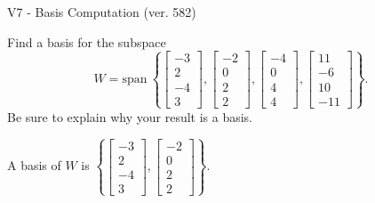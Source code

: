 \begin{exercise}
  \begin{exerciseTitle}V7 - Basis Computation (ver. 582)\end{exerciseTitle}
  \begin{exerciseStatement}
    Find a basis for the subspace 
\[W=\mathrm{span}\ \left\{\left[\begin{array}{r}
-3 \\
2 \\
-4 \\
3
\end{array}\right] , \left[\begin{array}{r}
-2 \\
0 \\
2 \\
2
\end{array}\right] , \left[\begin{array}{r}
-4 \\
0 \\
4 \\
4
\end{array}\right] , \left[\begin{array}{r}
11 \\
-6 \\
10 \\
-11
\end{array}\right]\right\}.\]
 Be sure to explain why your result is a basis.


  \end{exerciseStatement}
  \begin{exerciseAnswer}
   A basis of \(W\) is  \(\left\{\left[\begin{array}{r}
-3 \\
2 \\
-4 \\
3
\end{array}\right] , \left[\begin{array}{r}
-2 \\
0 \\
2 \\
2
\end{array}\right]\right\}\).
  


  \end{exerciseAnswer}
\end{exercise}